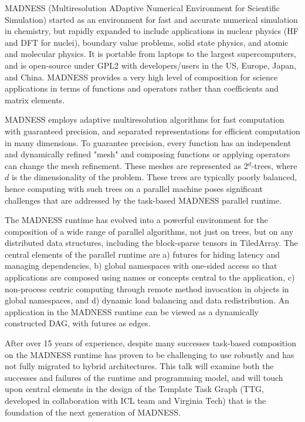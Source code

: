 MADNESS (Multiresolution ADaptive Numerical Environment for Scientific Simulation) started as an environment for fast and accurate numerical simulation in chemistry, but rapidly expanded to include applications in nuclear physics (HF and DFT for nuclei), boundary value problems, solid state physics, and atomic and molecular physics. It is portable from laptops to the largest supercomputers, and is open-source under GPL2 with developers/users in the US, Europe, Japan, and China. MADNESS provides a very high level of composition for science applications in terms of functions and operators rather than coefficients and matrix elements.

MADNESS employs adaptive multiresolution algorithms for fast computation with guaranteed precision, and separated representations for efficient computation in many dimensions.  To guarantee precision, every function has an independent and dynamically refined "mesh" and composing functions or applying operators can change the mesh refinement. These meshes are represented as 2$^{d}$-trees, where $d$ is the dimensionality of the problem. These trees are typically poorly balanced, hence computing with such trees on a parallel machine poses significant challenges that are addressed by the task-based MADNESS parallel runtime.

The MADNESS runtime has evolved into a powerful environment for the composition of a wide range of parallel algorithms, not just on trees, but on any distributed data structures, including the block-sparse tensors in TiledArray. The central elements of the parallel runtime are a) futures for hiding latency and managing dependencies, b) global namespaces with one-sided access so that applications are composed using names or concepts central to the application, c) non-process centric computing through remote method invocation in objects in global namespaces, and d) dynamic load balancing and data redistribution. An application in the MADNESS runtime can be viewed as a dynamically constructed DAG, with futures as edges.

After over 15 years of experience, despite many successes task-based composition on the MADNESS runtime has proven to be challenging to use robustly and has not fully migrated to hybrid architectures. This talk will examine both the successes and failures of the runtime and programming model, and will touch upon central elements in the design of the Template Task Graph (TTG, developed in collaboration with ICL team and Virginia Tech) that is the foundation of the next generation of MADNESS.

